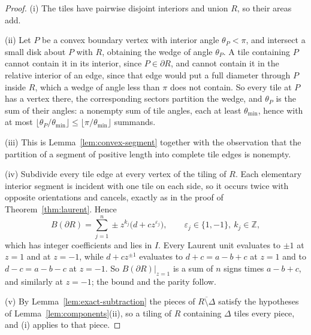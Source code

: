 \documentclass[11pt]{amsart}
\theoremstyle{definition}
\theoremstyle{remark}
\newcommand{\Z}{\mathbb Z}
\begin{document}
\begin{proof}
(i)  The tiles have pairwise disjoint interiors and union $R$, so their areas
add.

(ii)  Let $P$ be a convex boundary vertex with interior angle
$\theta_P<\pi$, and intersect a small disk about $P$ with $R$, obtaining the
wedge of angle $\theta_P$.  A tile containing $P$ cannot contain it in its
interior, since $P\in\partial R$, and cannot contain it in the relative
interior of an edge, since that edge would put a full diameter through $P$
inside $R$, which a wedge of angle less than $\pi$ does not contain.  So
every tile at $P$ has a vertex there, the corresponding sectors partition the
wedge, and $\theta_P$ is the sum of their angles: a nonempty sum of tile
angles, each at least $\theta_{\min}$, hence with at most
$\lfloor\theta_P/\theta_{\min}\rfloor\le\lfloor\pi/\theta_{\min}\rfloor$
summands.

(iii)  This is Lemma~\ref{lem:convex-segment} together with the observation
that the partition of a segment of positive length into complete tile edges
is nonempty.

(iv)  Subdivide every tile edge at every vertex of the tiling of $R$.  Each
elementary interior segment is incident with one tile on each side, so it
occurs twice with opposite orientations and cancels, exactly as in the proof
of Theorem~\ref{thm:laurent}.  Hence
\[
 B(\partial R)=\sum_{j=1}^n\pm z^{k_j}\big(d+cz^{\varepsilon_j}\big),
 \qquad \varepsilon_j\in\{1,-1\},\ k_j\in\Z,
\]
which has integer coefficients and lies in $I$.  Every Laurent unit
evaluates to $\pm1$ at $z=1$ and at $z=-1$, while
$d+cz^{\pm1}$ evaluates to $d+c=a-b+c$ at $z=1$ and to $d-c=a-b-c$ at
$z=-1$.  So $B(\partial R)|_{z=1}$ is a sum of $n$ signs times $a-b+c$, and
similarly at $z=-1$; the bound and the parity follow.

(v)  By Lemma~\ref{lem:exact-subtraction} the pieces of
$\overline{R\setminus\Delta}$ satisfy the hypotheses of
Lemma~\ref{lem:components}(ii), so a tiling of $R$ containing $\Delta$ tiles
every piece, and (i) applies to that piece.
\end{proof}
\end{document}

